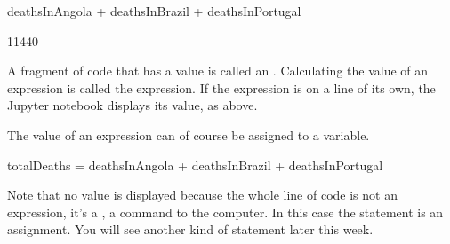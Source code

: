 \documentclass[letterpaper,10pt,english]{sphinxmanual}
\begin{document}

{
\begin{sphinxVerbatim}[commandchars=\\\{\}]
\llap{\color{nbsphinxin}[ ]:\,\hspace{\fboxrule}\hspace{\fboxsep}}
deathsInAngola + deathsInBrazil + deathsInPortugal
\end{sphinxVerbatim}
}


{
\begin{sphinxVerbatim}[commandchars=\\\{\}]
\llap{\color{nbsphinxin}[ ]:\,\hspace{\fboxrule}\hspace{\fboxsep}}
11440
\end{sphinxVerbatim}
}

A fragment of code that has a value is called an . Calculating the value of an expression is called  the expression. If the expression is on a line of its own, the Jupyter notebook displays its value, as above.

The value of an expression can of course be assigned to a variable.


{
\begin{sphinxVerbatim}[commandchars=\\\{\}]
\llap{\color{nbsphinxin}[ ]:\,\hspace{\fboxrule}\hspace{\fboxsep}}

totalDeaths = deathsInAngola + deathsInBrazil + deathsInPortugal

\end{sphinxVerbatim}
}

Note that no value is displayed because the whole line of code is not an expression, it’s a  , a command to the computer. In this case the statement is an assignment. You will see another kind of statement later this week.
\end{document}
